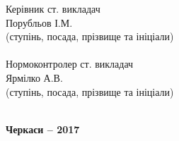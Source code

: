 \documentclass[../main.tex]{subfiles}
\begin{document}
\begin{titlepage}
{\begin{flushright}
\begin{minipage}[t]{6.8cm}
\begin{flushright}
						Керівник ст. викладач \\
						Порубльов І.М. \\
						(ступінь, посада, прізвище та ініціали) \\
						\hrulefill \\
						\vspace{\baselineskip}
						Нормоконтролер ст. викладач \\
						Ярмілко А.В. \\ %
						(ступінь, посада, прізвище та ініціали) \\
						\hrulefill \\
					\end{flushright}
				\end{minipage}
			\end{flushright}
		}
		\vfill
		{\centering\bfseries Черкаси -- 2017 \\ }
	\end{titlepage}
	
\end{document}
